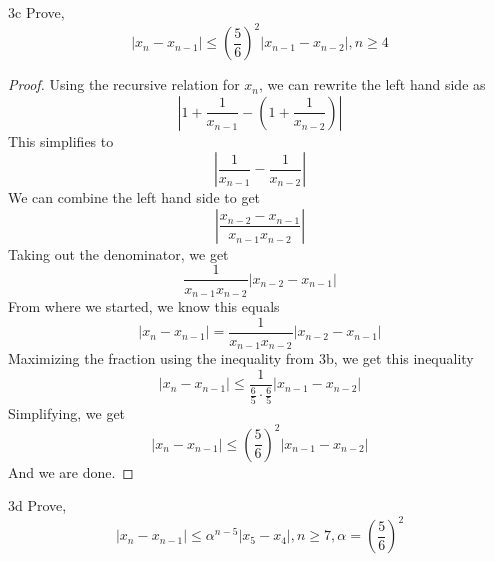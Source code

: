 \documentclass[boxes]{rutgers_hw}
\begin{document}
\begin{exern}{3}
    \begin{exern}{3c}
      Prove,
      \[ |x_n - x_{n-1}| \le {\left(\frac56\right)}^2|x_{n-1} - x_{n-2}|, n \ge 4\]
    \end{exern}

    \begin{proof}
      Using the recursive relation for $x_n$, we can rewrite the left hand side as
      \[ \left|{1 + \frac1{x_{n-1}} - \left(1 + \frac1{x_{n-2}}\right)}\right| \]
      This simplifies to
      \[ \left|{\frac1{x_{n-1}} - \frac1{x_{n-2}}}\right| \]
      We can combine the left hand side to get
      \[ \left|\frac{x_{n-2} - x_{n-1}}{x_{n-1}x_{n-2}}\right|\]
      Taking out the denominator, we get
      \[ \frac1{x_{n-1}x_{n-2}} \left|x_{n-2} - x_{n-1}\right|\]
      From where we started, we know this equals
      \[ |x_n - x_{n-1}| = \frac1{x_{n-1}x_{n-2}} \left|x_{n-2} - x_{n-1}\right| \]
      Maximizing the fraction using the inequality from 3b, we get this inequality
      \[ |x_n - x_{n-1}| \le \frac1{\frac65 \cdot \frac65}|x_{n-1} - x_{n-2}|\]
      Simplifying, we get
      \[ |x_n - x_{n-1}| \le {\left(\frac56\right)}^2|x_{n-1} - x_{n-2}|\]
      And we are done.
    \end{proof}

    \begin{exern}{3d}
      Prove,
      \[ |x_n - x_{n-1}| \le {\alpha}^{n-5}|x_{5} - x_{4}|, n \ge 7, \alpha = {\left(\frac56\right)}^2\]
    \end{exern}


\end{exern}
\end{document}
